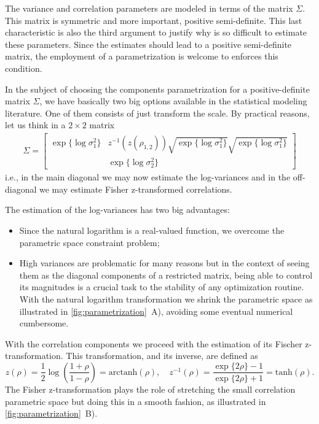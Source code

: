 The variance and correlation parameters are modeled in terms of the
matrix \(\Sigma\). This matrix is symmetric and more important, positive
semi-definite. This last characteristic is also the third argument to
justify why is so difficult to estimate these parameters. Since the
estimates should lead to a positive semi-definite matrix, the employment
of a parametrization is welcome to enforces this condition.

In the subject of choosing the components parametrization for a
positive-definite matrix \(\Sigma\), we have basically two big options
available in the statistical modeling literature. One of them consists
of just transform the scale. By practical reasons, let us think in a
\(2\times 2\) matrix
\begin{align*}
 \Sigma = \begin{bmatrix}
           \exp\{\log\sigma_{1}^{2}\}&
           z^{-1}(z(\rho_{1,2}))
           \sqrt{\exp\{\log\sigma_{1}^{2}\}}
           \sqrt{\exp\{\log\sigma_{1}^{2}\}}\\
           &\exp\{\log\sigma_{2}^{2}\}
          \end{bmatrix}
\end{align*}
i.e., in the main diagonal we may now estimate the log-variances and in
the off-diagonal we may estimate Fisher z-transformed correlations.

The estimation of the log-variances has two big advantages:
\begin{itemize}
 \item Since the natural logarithm is a real-valued function, we
       overcome the parametric space constraint problem;

 \item High variances are problematic for many reasons but in the
       context of seeing them as the diagonal components of a restricted
       matrix, being able to control its magnitudes is a crucial task to
       the stability of any optimization routine. With the natural
       logarithm transformation we shrink the parametric space as
       illustrated in \autoref{fig:parametrization}~A), avoiding some
       eventual numerical cumbersome.
\end{itemize}
With the correlation components we proceed with the estimation of its
Fischer z-transformation. This transformation, and its inverse, are
defined as
\[
 z(\rho) = \frac{1}{2}\log\left(\frac{1+\rho}{1-\rho}\right)
         = \text{arctanh}(\rho),\quad
 z^{-1}(\rho) = \frac{\exp\{2\rho\}-1}{\exp\{2\rho\}+1}
             = \text{tanh}(\rho).
\]
The Fisher z-transformation plays the role of stretching the small
correlation parametric space but doing this in a smooth fashion, as
illustrated in \autoref{fig:parametrization}~B).

